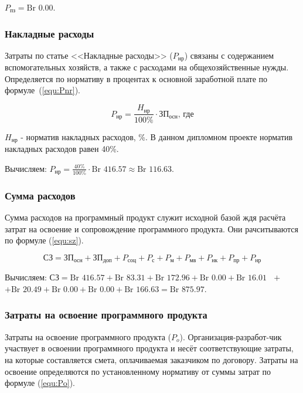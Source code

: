 $P_\text{пз} = \text{Br }0.00$.

\subsubsection*{Накладные расходы}

Затраты по статье <<Накладные расходы>> ($P_\text{нр}$) связаны с содержанием вспомогательных хозяйств,
а также с расходами на общехозяйственные нужды.
Определяется по нормативу в процентах к основной заработной плате по формуле~(\ref{equ:Pnr}).

\begin{equation}
    \label{equ:Pnr}
    P_\text{нр} = \frac{ H_\text{нр} }{ 100\% } \cdot \text{ЗП}_\text{осн} \text{, где}
\end{equation}

$H_\text{нр}$ - норматив накладных расходов, \%. В данном дипломном проекте норматив накладных расходов равен 40\%.

Вычисляем: $P_\text{нр} = \frac{ 40\% }{ 100\% } \cdot \text{Br }416.57 \approx \text{Br }116.63$.

\subsubsection*{Сумма расходов}

Сумма расходов на программный продукт служит исходной базой ждя расчёта затрат на освоение и сопровождение программного продукта.
Они рачситываются по формуле (\ref{equ:sz}).

\begin{equation}
    \label{equ:sz}
    \text{СЗ} = \text{ЗП}_\text{осн} + \text{ЗП}_\text{доп} + P_\text{соц} + P_\text{с} + P_\text{м} + P_\text{мв}
    + P_\text{нк} + P_\text{пр} + P_\text{нр}
\end{equation}

Вычисляем: $\text{СЗ} = \text{Br }416.57 + \text{Br }83.31 + \text{Br }172.96 + \text{Br }0.00 + \text{Br }16.01 \text{ }+$
$+ \text{Br }20.49 + \text{Br }0.00 + \text{Br }0.00 + \text{Br } 166.63 = \text{Br }875.97$.

\subsubsection*{Затраты на освоение программного продукта}

Затраты на освоение программного продукта ($P_o$).
Организация-разработ-чик участвует в освоении программного продукта и несёт соответствующие затраты,
на которые составляется смета, оплачиваемая заказчиком по договору.
Затраты на освоение определяются по установленному нормативу от суммы затрат по формуле (\ref{equ:Po}). 

